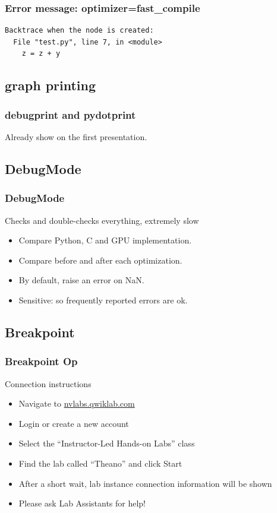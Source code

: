 \documentclass[utf8x,xcolor=pdftex,dvipsnames,table]{beamer}
\begin{document}
\begin{frame}[fragile]
  \frametitle{Error message: optimizer=fast\_compile}

\begin{lstlisting}
Backtrace when the node is created:
  File "test.py", line 7, in <module>
    z = z + y

\end{lstlisting}
\end{frame}

\subsection{graph printing}
\begin{frame}
  \frametitle{debugprint and pydotprint}
Already show on the first presentation.
\end{frame}

\subsection{DebugMode}
\begin{frame}[fragile]
  \frametitle{DebugMode}
    Checks and double-checks everything, extremely slow
\begin{itemize}
\item Compare Python, C and GPU implementation.
\item Compare before and after each optimization.
\item By default, raise an error on NaN.
\item Sensitive: so frequently reported errors are ok.
\end{itemize}
\end{frame}

\subsection{Breakpoint}
\begin{frame}
  \frametitle{Breakpoint Op}


\end{frame}

\begin{frame}{Connection instructions}
\begin{itemize}
\item Navigate to \url{nvlabs.qwiklab.com}
\item Login or create a new account
\item Select the ``Instructor-Led Hands-on Labs'' class
\item Find the lab called ``Theano'' and click Start
\item After a short wait, lab instance connection information will be shown
\item Please ask Lab Assistants for help!
\end{itemize}
\end{frame}
\end{document}
